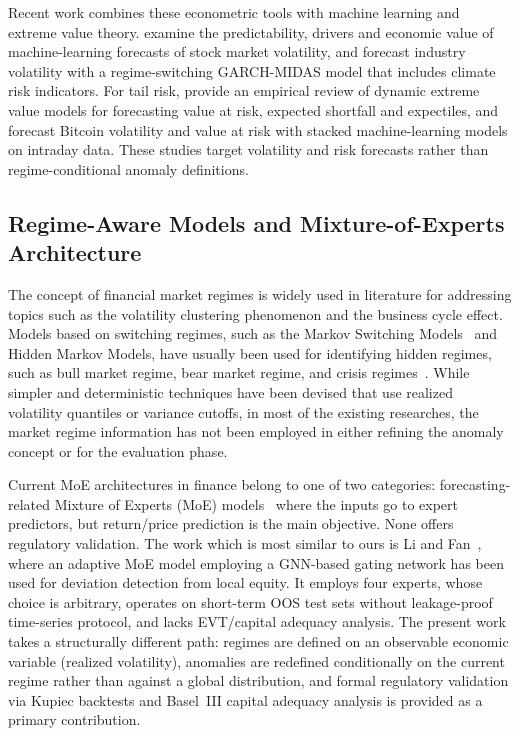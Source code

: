 \documentclass[]{interact}
\begin{document}
Recent work combines these econometric tools with machine learning and extreme value theory. \citet{diaz2024volatility} examine the predictability, drivers and economic value of machine-learning forecasts of stock market volatility, and \citet{ghani2025regime} forecast industry volatility with a regime-switching GARCH-MIDAS model that includes climate risk indicators. For tail risk, \citet{candia2024evt} provide an empirical review of dynamic extreme value models for forecasting value at risk, expected shortfall and expectiles, and \citet{pourrezaee2025bitcoin} forecast Bitcoin volatility and value at risk with stacked machine-learning models on intraday data. These studies target volatility and risk forecasts rather than regime-conditional anomaly definitions.

\subsection{Regime-Aware Models and Mixture-of-Experts Architecture}

The concept of financial market regimes is widely used in literature
for addressing topics such as the volatility clustering phenomenon and
the business cycle effect. Models based on switching regimes, such
as the Markov Switching Models~\citep{hamilton1989a} and Hidden Markov Models,
have usually been used for identifying hidden regimes, such as bull
market regime, bear market regime, and crisis regimes~\citep{ang2002regime, guidolin2011markov}.
While simpler and deterministic techniques have been devised that use
realized volatility quantiles or variance cutoffs, in most of the existing
researches, the market regime information has not been employed in
either refining the anomaly concept or for the evaluation phase.

Current MoE architectures in finance belong to one of two categories:
forecasting-related Mixture of Experts (MoE) models~\citep{alkilane2024mixma}
where the inputs go to expert predictors, but return/price prediction is the main objective.
None offers regulatory validation. The work which is most similar to ours is
Li and Fan~\citep{fan2025expla}, where an adaptive MoE model employing a GNN-based
gating network has been used for deviation detection from local equity.
It employs four experts, whose choice is arbitrary, operates on short-term OOS
test sets without leakage-proof time-series protocol, and lacks EVT/capital adequacy analysis. The present work takes a structurally different path: regimes are defined on an observable economic variable (realized volatility), anomalies are redefined conditionally on the current regime rather than against a global distribution, and formal regulatory validation via Kupiec backtests and Basel~III capital adequacy analysis is provided as a primary contribution.
\end{document}
